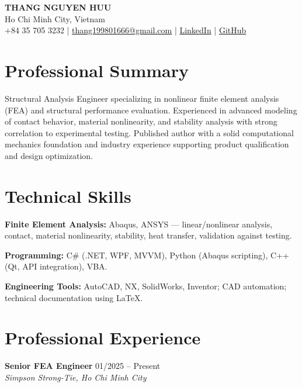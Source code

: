 \documentclass[a4paper,10pt]{article}
\begin{document}

\begin{center}
    {\LARGE \textbf{THANG NGUYEN HUU}} \\
    Ho Chi Minh City, Vietnam \\
    +84 35 705 3232 \quad | \quad 
    \href{mailto:thang199801666@gmail.com}{thang199801666@gmail.com} \quad | \quad 
    \href{https://www.linkedin.com/in/thang-nguyen-huu-721669167/}{LinkedIn} \quad | \quad
    \href{https://github.com/thang199801666}{GitHub}
\end{center}

\section*{Professional Summary}

Structural Analysis Engineer specializing in nonlinear finite element analysis (FEA) and structural performance evaluation. Experienced in advanced modeling of contact behavior, material nonlinearity, and stability analysis with strong correlation to experimental testing. Published author with a solid computational mechanics foundation and industry experience supporting product qualification and design optimization.


\section*{Technical Skills}

\textbf{Finite Element Analysis:} Abaqus, ANSYS — linear/nonlinear analysis, contact, material nonlinearity, stability, heat transfer, validation against testing.

\textbf{Programming:} C\# (.NET, WPF, MVVM), Python (Abaqus scripting), C++ (Qt, API integration), VBA.

\textbf{Engineering Tools:} AutoCAD, NX, SolidWorks, Inventor; CAD automation; technical documentation using \LaTeX{}.

\section*{Professional Experience}

\textbf{Senior FEA Engineer} \hfill 01/2025 -- Present \\
\textit{Simpson Strong-Tie, Ho Chi Minh City}
\end{document}
